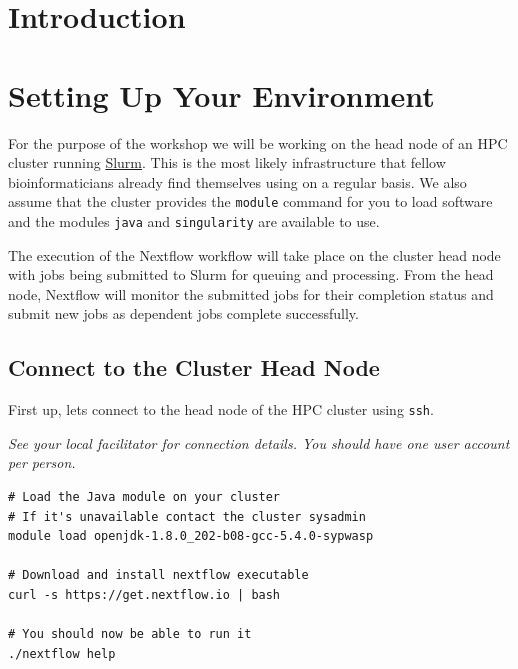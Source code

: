 \newpage

\section{Introduction}


\newpage

\section{Setting Up Your Environment}

For the purpose of the workshop we will be working on the head node of an HPC cluster running \href{https://slurm.schedmd.com/documentation.html}{Slurm}.
This is the most likely infrastructure that fellow bioinformaticians already find themselves using
on a regular basis. We also assume that the cluster provides the \texttt{module} command for you to
load software and the modules \texttt{java} and \texttt{singularity} are available to use.

The execution of the Nextflow workflow will take place on the cluster head node with jobs
being submitted to Slurm for queuing and processing. From the head node, Nextflow will monitor the
submitted jobs for their completion status and submit new jobs as dependent jobs complete successfully.


\subsection{Connect to the Cluster Head Node}

\begin{steps}
First up, lets connect to the head node of the HPC cluster using \texttt{ssh}.

\emph{See your local facilitator for connection details. You should have one user account per person.}
\end{steps}


\begin{steps}
\begin{lstlisting}
# Load the Java module on your cluster
# If it's unavailable contact the cluster sysadmin
module load openjdk-1.8.0_202-b08-gcc-5.4.0-sypwasp 

# Download and install nextflow executable
curl -s https://get.nextflow.io | bash

# You should now be able to run it
./nextflow help
\end{lstlisting}
\end{steps}

